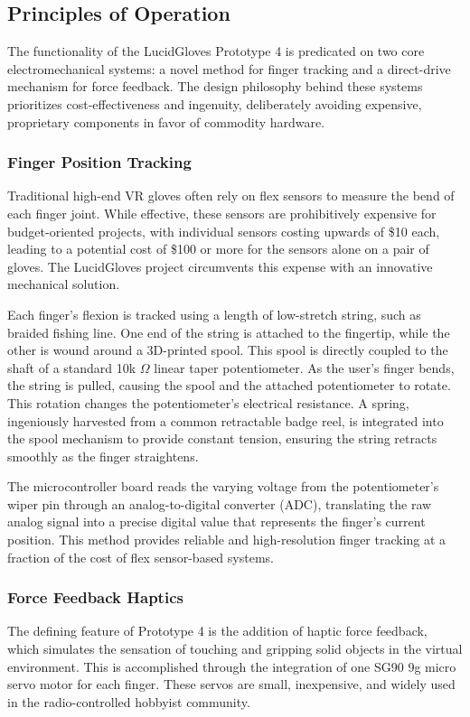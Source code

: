 \documentclass{article}
\begin{document}
\subsection{Principles of Operation}
The functionality of the LucidGloves Prototype 4 is predicated on two core electromechanical systems: a novel method for finger tracking and a direct-drive mechanism for force feedback. The design philosophy behind these systems prioritizes cost-effectiveness and ingenuity, deliberately avoiding expensive, proprietary components in favor of commodity hardware.

\subsubsection{Finger Position Tracking}
Traditional high-end VR gloves often rely on flex sensors to measure the bend of each finger joint. While effective, these sensors are prohibitively expensive for budget-oriented projects, with individual sensors costing upwards of \$10 each, leading to a potential cost of \$100 or more for the sensors alone on a pair of gloves. The LucidGloves project circumvents this expense with an innovative mechanical solution.

Each finger's flexion is tracked using a length of low-stretch string, such as braided fishing line. One end of the string is attached to the fingertip, while the other is wound around a 3D-printed spool. This spool is directly coupled to the shaft of a standard 10k $\Omega$ linear taper potentiometer. As the user's finger bends, the string is pulled, causing the spool and the attached potentiometer to rotate. This rotation changes the potentiometer's electrical resistance. A spring, ingeniously harvested from a common retractable badge reel, is integrated into the spool mechanism to provide constant tension, ensuring the string retracts smoothly as the finger straightens.

The microcontroller board reads the varying voltage from the potentiometer's wiper pin through an analog-to-digital converter (ADC), translating the raw analog signal into a precise digital value that represents the finger's current position. This method provides reliable and high-resolution finger tracking at a fraction of the cost of flex sensor-based systems.

\subsubsection{Force Feedback Haptics}
The defining feature of Prototype 4 is the addition of haptic force feedback, which simulates the sensation of touching and gripping solid objects in the virtual environment. This is accomplished through the integration of one SG90 9g micro servo motor for each finger. These servos are small, inexpensive, and widely used in the radio-controlled hobbyist community.
\end{document}
